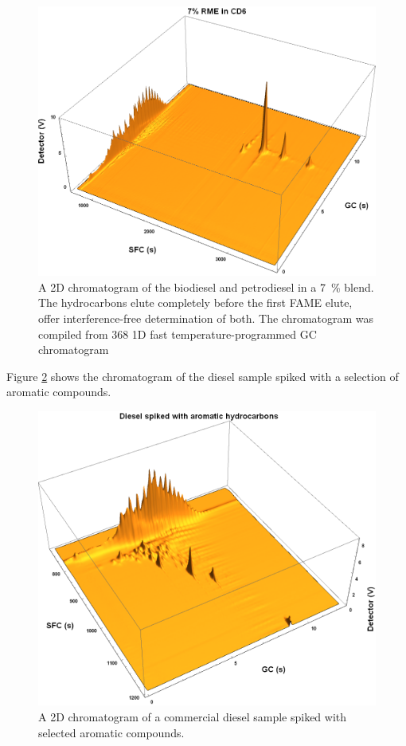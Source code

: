 \begin{figure}
	\centering
	\includegraphics[width=\textwidth]{Figures/PAH_FAMEs.png}
	\decoRule	
	
\caption[Biodiesel separated from petrodiesel.]{A 2D chromatogram of the
biodiesel and petrodiesel in a \SI{7}{\percent} blend. The hydrocarbons elute
completely before the first FAME elute, offer interference-free determination of
both. The chromatogram was compiled from \num{368} 1D fast temperature-programmed GC
chromatogram}

	\label{fig:PAH_FAMEs} 
\end{figure}

Figure \ref{fig:Spiked_Diesel} shows the chromatogram of the diesel sample spiked with a selection of aromatic compounds. 

\begin{figure}
	\centering
	\includegraphics[width=\textwidth]{Figures/Spiked_Diesel.png}
	\decoRule	
	
\caption[Spiked diesel ]{A 2D chromatogram of a commercial diesel sample spiked with selected aromatic compounds.}

	\label{fig:Spiked_Diesel} 
\end{figure}


